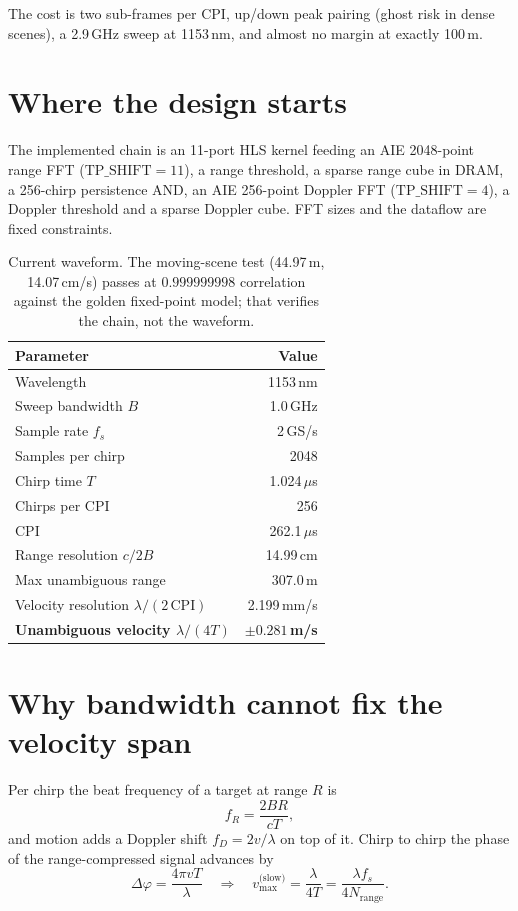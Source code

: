 \documentclass[11pt,a4paper]{article}
\newcommand{\fs}{f_s}
\newcommand{\vmax}{v_{\max}}
\newcommand{\CPI}{\mathrm{CPI}}
\begin{document}
The cost is two sub-frames per CPI, up/down peak pairing (ghost risk in dense
scenes), a 2.9\,GHz sweep at 1153\,nm, and almost no margin at exactly 100\,m.

\section{Where the design starts}

The implemented chain is an 11-port HLS kernel feeding an AIE 2048-point range
FFT ($\mathrm{TP\_SHIFT}=11$), a range threshold, a sparse range cube in DRAM,
a 256-chirp persistence AND, an AIE 256-point Doppler FFT
($\mathrm{TP\_SHIFT}=4$), a Doppler threshold and a sparse Doppler cube. FFT
sizes and the dataflow are fixed constraints.

\begin{table}[h]
\centering
\small
\begin{tabular}{@{}lr@{}}
\toprule
Parameter & Value \\
\midrule
Wavelength & 1153\,nm \\
Sweep bandwidth $B$ & 1.0\,GHz \\
Sample rate $\fs$ & 2\,GS/s \\
Samples per chirp & 2048 \\
Chirp time $T$ & 1.024\,$\mu$s \\
Chirps per CPI & 256 \\
CPI & 262.1\,$\mu$s \\
Range resolution $c/2B$ & 14.99\,cm \\
Max unambiguous range & 307.0\,m \\
Velocity resolution $\lambda/(2\,\CPI)$ & 2.199\,mm/s \\
\textbf{Unambiguous velocity $\lambda/(4T)$} & \textbf{$\pm0.281$\,m/s} \\
\bottomrule
\end{tabular}
\caption{Current waveform. The moving-scene test (44.97\,m, 14.07\,cm/s) passes
at $0.999999998$ correlation against the golden fixed-point model; that
verifies the chain, not the waveform.}
\end{table}

\section{Why bandwidth cannot fix the velocity span}

Per chirp the beat frequency of a target at range $R$ is
\begin{equation}
f_R = \frac{2BR}{cT},
\end{equation}
and motion adds a Doppler shift $f_D = 2v/\lambda$ on top of it. Chirp to chirp
the phase of the range-compressed signal advances by
\begin{equation}
\Delta\varphi = \frac{4\pi vT}{\lambda}
\quad\Longrightarrow\quad
\vmax^{\text{(slow)}} = \frac{\lambda}{4T} = \frac{\lambda \fs}{4N_{\text{range}}}.
\end{equation}
\end{document}
